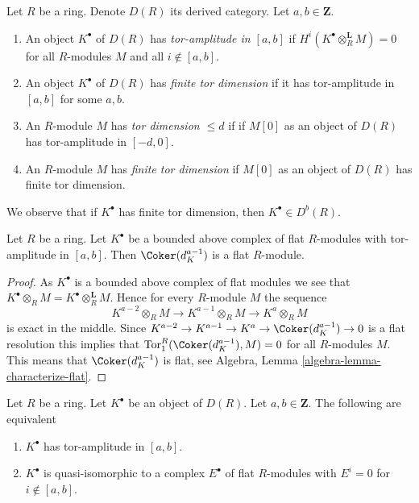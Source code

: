 \begin{definition}
\label{definition-tor-amplitude}
Let $R$ be a ring. Denote $D(R)$ its derived category.
Let $a, b \in \mathbf{Z}$.
\begin{enumerate}
\item An object $K^\bullet$ of $D(R)$ has
{\it tor-amplitude in $[a, b]$}
if $H^i(K^\bullet \otimes_R^\mathbf{L} M) = 0$ for all $R$-modules
$M$ and all $i \not \in [a, b]$.
\item An object $K^\bullet$ of $D(R)$ has {\it finite tor dimension}
if it has tor-amplitude in $[a, b]$ for some $a, b$.
\item An $R$-module $M$ has {\it tor dimension $\leq d$} if
if $M[0]$ as an object of $D(R)$ has tor-amplitude in $[-d, 0]$.
\item An $R$-module $M$ has {\it finite tor dimension}
if $M[0]$ as an object of $D(R)$ has finite tor dimension.
\end{enumerate}
\end{definition}

\noindent
We observe that if $K^\bullet$ has finite tor dimension,
then $K^\bullet \in D^b(R)$.

\begin{lemma}
\label{lemma-last-one-flat}
Let $R$ be a ring. Let $K^\bullet$ be a bounded above complex of
flat $R$-modules with tor-amplitude in $[a, b]$.
Then $\Coker(d_K^{a - 1})$ is a flat $R$-module.
\end{lemma}

\begin{proof}
As $K^\bullet$ is a bounded above complex of flat modules we see
that $K^\bullet \otimes_R M = K^\bullet \otimes_R^{\mathbf{L}} M$.
Hence for every $R$-module $M$ the sequence
$$
K^{a - 2} \otimes_R M \to K^{a - 1} \otimes_R M \to K^a \otimes_R M
$$
is exact in the middle. Since
$K^{a - 2} \to K^{a - 1} \to K^a \to \Coker(d_K^{a - 1}) \to 0$
is a flat resolution this implies that
$\text{Tor}_1^R(\Coker(d_K^{a - 1}), M) = 0$
for all $R$-modules $M$. This means that
$\Coker(d_K^{a - 1})$ is flat, see
Algebra, Lemma \ref{algebra-lemma-characterize-flat}.
\end{proof}

\begin{lemma}
\label{lemma-tor-amplitude}
Let $R$ be a ring. Let $K^\bullet$ be an object of $D(R)$.
Let $a, b \in \mathbf{Z}$. The following are equivalent
\begin{enumerate}
\item $K^\bullet$ has tor-amplitude in $[a, b]$.
\item $K^\bullet$ is quasi-isomorphic to a complex
$E^\bullet$ of flat $R$-modules with $E^i = 0$ for $i \not \in [a, b]$.
\end{enumerate}
\end{lemma}

